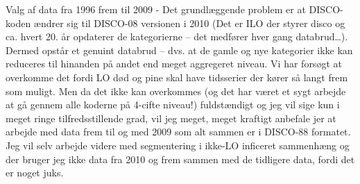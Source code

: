 Valg af data fra 1996 frem til 2009
- Det grundlæggende problem er at DISCO-koden ændrer sig til DISCO-08 versionen i 2010 (Det er ILO der styrer disco og ca. hvert 20. år opdaterer de kategorierne – det medfører hver gang databrud…). Dermed opstår et genuint databrud – dvs. at de gamle og nye kategorier ikke kan reduceres til hinanden på andet end meget aggregeret niveau. Vi har forsøgt at overkomme det fordi LO død og pine skal have tidsserier der kører så langt frem som muligt. Men da det ikke kan overkommes (og det har været et sygt arbejde at gå gennem alle koderne på 4-cifte niveau!) fuldstændigt og jeg vil sige kun i meget ringe tilfredsstillende grad, vil jeg meget, meget kraftigt anbefale jer at arbejde med data frem til og med 2009 som alt sammen er i DISCO-88 formatet. Jeg vil selv arbejde videre med segmentering i ikke-LO inficeret sammenhæng og der bruger jeg ikke data fra 2010 og frem sammen med de tidligere data, fordi det er noget juks.





























